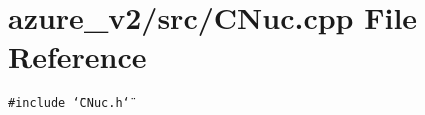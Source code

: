 \section{azure\_\-v2/src/CNuc.cpp File Reference}
\label{CNuc_8cpp}
{\tt \#include \char`\"{}CNuc.h\char`\"{}}\par
